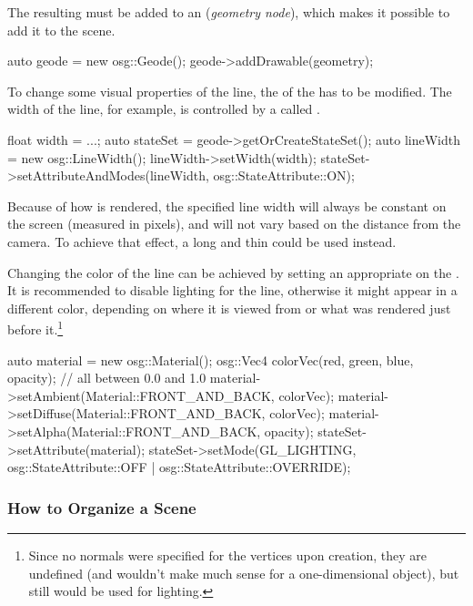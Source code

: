The resulting  must be added to an 
(\textit{geometry node}), which makes it possible to add it to the scene.

\begin{cpp}
auto geode = new osg::Geode();
geode->addDrawable(geometry);
\end{cpp}

To change some visual properties of the line, the  of the
 has to be modified. The width of the line, for example, is
controlled by a  called .

\begin{cpp}
float width = ...;
auto stateSet = geode->getOrCreateStateSet();
auto lineWidth = new osg::LineWidth();
lineWidth->setWidth(width);
stateSet->setAttributeAndModes(lineWidth, osg::StateAttribute::ON);
\end{cpp}

Because of how  is rendered, the specified line width
will always be constant on the screen (measured in pixels), and will not vary
based on the distance from the camera. To achieve that effect, a long and thin
 could be used instead.

Changing the color of the line can be achieved by setting an appropriate
 on the . It is recommended to
disable lighting for the line, otherwise it might appear in a different color,
depending on where it is viewed from or what was rendered just before
it.\footnote{Since no normals were specified for the vertices upon creation,
they are undefined (and wouldn't make much sense for a one-dimensional object),
but still would be used for lighting.}

\begin{cpp}
auto material = new osg::Material();
osg::Vec4 colorVec(red, green, blue, opacity); // all between 0.0 and 1.0
material->setAmbient(Material::FRONT_AND_BACK, colorVec);
material->setDiffuse(Material::FRONT_AND_BACK, colorVec);
material->setAlpha(Material::FRONT_AND_BACK, opacity);
stateSet->setAttribute(material);
stateSet->setMode(GL_LIGHTING,
            osg::StateAttribute::OFF | osg::StateAttribute::OVERRIDE);
\end{cpp}

\subsubsection{How to Organize a Scene}

